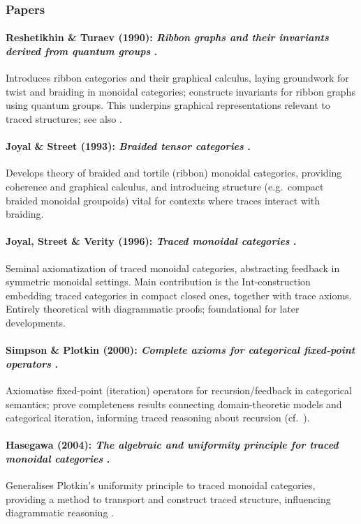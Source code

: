 \subsubsection*{Papers}
\paragraph{Reshetikhin \& Turaev (1990): \emph{Ribbon graphs and their invariants derived from quantum groups} \cite{reshetikhin1990-ribbon-graphs-invaraints}.}
Introduces ribbon categories and their graphical calculus, laying groundwork for twist and braiding in monoidal categories; constructs invariants for ribbon graphs using quantum groups. This underpins graphical representations relevant to traced structures; see also \cite{matsuo2024-quantum-toroidal-algebras}.
\paragraph{Joyal \& Street (1993): \emph{Braided tensor categories} \cite{joyal1993-braided-tensor-categories}.}
Develops theory of braided and tortile (ribbon) monoidal categories, providing coherence and graphical calculus, and introducing structure (e.g.\ compact braided monoidal groupoids) vital for contexts where traces interact with braiding.
\paragraph{Joyal, Street \& Verity (1996): \emph{Traced monoidal categories} \cite{joyal1996-traced-monoidal-categories}.}
Seminal axiomatization of traced monoidal categories, abstracting feedback in symmetric monoidal settings. Main contribution is the $\mathrm{Int}$-construction embedding traced categories in compact closed ones, together with trace axioms. Entirely theoretical with diagrammatic proofs; foundational for later developments.
\paragraph{Simpson \& Plotkin (2000): \emph{Complete axioms for categorical fixed-point operators} \cite{simpson2000-complete-axioms-categorical}.}
Axiomatise fixed-point (iteration) operators for recursion/feedback in categorical semantics; prove completeness results connecting domain-theoretic models and categorical iteration, informing traced reasoning about recursion (cf.\ \cite{bloom1989-equational-logic-iterative}).
\paragraph{Hasegawa (2004): \emph{The algebraic and uniformity principle for traced monoidal categories} \cite{hasegawa2003-uniformity-principle-traced}.}
Generalises Plotkin’s uniformity principle to traced monoidal categories, providing a method to transport and construct traced structure, influencing diagrammatic reasoning \cite{bonchi2025-diagrammatic-algebra-program,ponto2014-traces-symmetric-monoidal}.
